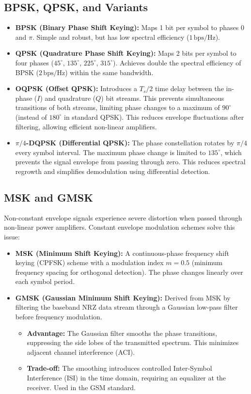 \documentclass[12pt,a4paper]{article}
\begin{document}
\subsection{BPSK, QPSK, and Variants}
\begin{itemize}[leftmargin=*, itemsep=3.0pt]
  \item \textbf{BPSK (Binary Phase Shift Keying):} Maps 1 bit per symbol to phases $0$ and $\pi$. Simple and robust, but has low spectral efficiency ($1\,\text{bps/Hz}$).
  \item \textbf{QPSK (Quadrature Phase Shift Keying):} Maps 2 bits per symbol to four phases ($45^\circ$, $135^\circ$, $225^\circ$, $315^\circ$). Achieves double the spectral efficiency of BPSK ($2\,\text{bps/Hz}$) within the same bandwidth.
  \item \textbf{OQPSK (Offset QPSK):} Introduces a $T_s/2$ time delay between the in-phase ($I$) and quadrature ($Q$) bit streams. This prevents simultaneous transitions of both streams, limiting phase changes to a maximum of $90^\circ$ (instead of $180^\circ$ in standard QPSK). This reduces envelope fluctuations after filtering, allowing efficient non-linear amplifiers.
  \item \textbf{$\pi/4$-DQPSK (Differential QPSK):} The phase constellation rotates by $\pi/4$ every symbol interval. The maximum phase change is limited to $135^\circ$, which prevents the signal envelope from passing through zero. This reduces spectral regrowth and simplifies demodulation using differential detection.
\end{itemize}

\subsection{MSK and GMSK}
Non-constant envelope signals experience severe distortion when passed through non-linear power amplifiers. Constant envelope modulation schemes solve this issue:
\begin{itemize}[leftmargin=*, itemsep=3pt]
  \item \textbf{MSK (Minimum Shift Keying):} A continuous-phase frequency shift keying (CPFSK) scheme with a modulation index $m = 0.5$ (minimum frequency spacing for orthogonal detection). The phase changes linearly over each symbol period.
  \item \textbf{GMSK (Gaussian Minimum Shift Keying):} Derived from MSK by filtering the baseband NRZ data stream through a Gaussian low-pass filter before frequency modulation.
    \begin{itemize}[leftmargin=*, itemsep=2pt, topsep=2pt]
      \item \textbf{Advantage:} The Gaussian filter smooths the phase transitions, suppressing the side lobes of the transmitted spectrum. This minimizes adjacent channel interference (ACI).
      \item \textbf{Trade-off:} The smoothing introduces controlled Inter-Symbol Interference (ISI) in the time domain, requiring an equalizer at the receiver. Used in the GSM standard.
    \end{itemize}
\end{itemize}
\end{document}
